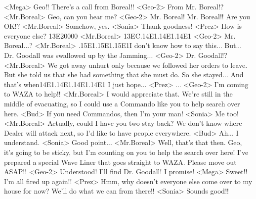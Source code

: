 <Mega> Geo!! There's a call from Boreal!! 
<Geo-2> From Mr. Boreal!? 
<Mr.Boreal> Geo, can you hear me? 
<Geo-2> Mr. Boreal! Mr. Boreal!! 
Are you OK!? 
<Mr.Boreal> Somehow, yes. 
<Sonia> Thank goodness! 
<Prez> How is everyone else? 
{13}{E2}{00}{00} 
<Mr.Boreal> {13}{EC}.{14}{E1}.{14}{E1}.{14}{E1} 
<Geo-2> Mr. Boreal...? 
<Mr.Boreal> .{15}{E1}.{15}{E1}.{15}{E1}I don't know how to say this... But... 
Dr. Goodall was swallowed up by the Jamming... 
<Geo-2> Dr. Goodall!? 
<Mr.Boreal> We got away unhurt only because we followed her orders to leave. 
But she told us that she had something that she must do. So she stayed... 
And that's when{14}{E1}.{14}{E1}.{14}{E1}.{14}{E1} 
I just hope... 
<Prez> ... 
<Geo-2> I'm coming to WAZA to help!! 
<Mr.Boreal> I would appreciate that. We're still in the middle of evacuating, so I could use 
a Commando like you to help search over here. 
<Bud> If you need Commandos, then I'm your man! 
<Sonia> Me too! 
<Mr.Boreal> Actually, could I have you two stay back? 
We don't know where Dealer will attack next, so I'd like to have people everywhere. 
<Bud> Ah... I understand. 
<Sonia> Good point... 
<Mr.Boreal> Well, that's that then. 
Geo, it's going to be sticky, but I'm counting on you to help the search over here! 
I've prepared a special Wave Liner that goes straight to WAZA. 
Please move out ASAP!! 
<Geo-2> Understood! 
I'll find Dr. Goodall! I promise! 
<Mega> Sweet!! I'm all fired up again!! 
<Prez> Hmm, why doesn't everyone else come over to my house for now? 
We'll do what we can from there!! 
<Sonia> Sounds good!! 
